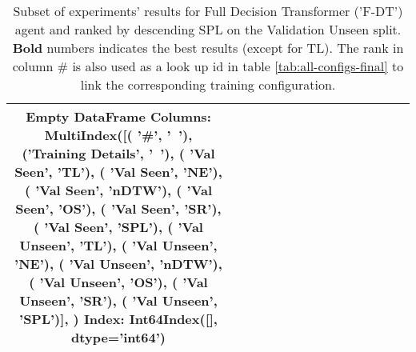 \begin{table}
\centering
\caption{\label{tab:f_dt_lr}Subset of experiments' results for Full Decision Transformer ('F-DT') agent and ranked by descending SPL on the Validation Unseen split. \textbf{Bold} numbers indicates the best results (except for TL). The rank in column \# is also used as a look up id in table \ref{tab:all-configs-final} to link the corresponding training configuration.}
\begin{tabular}{@{\hskip3pt}c@{\hskip3pt}c@{\hskip3pt}c@{\hskip3pt}c@{\hskip3pt}c@{\hskip3pt}c@{\hskip3pt}c@{\hskip3pt}c@{\hskip3pt}c@{\hskip3pt}c@{\hskip3pt}c@{\hskip3pt}c@{\hskip3pt}c@{\hskip3pt}c@{\hskip3pt}c}
\toprule
Empty DataFrame
Columns: MultiIndex([(              '\textbf{\#}',    '\textbf{~}'),
            ('\textbf{Training Details}',    '\textbf{~}'),
            (        '\textbf{Val Seen}',   '\textbf{TL}'),
            (        '\textbf{Val Seen}',   '\textbf{NE}'),
            (        '\textbf{Val Seen}', '\textbf{nDTW}'),
            (        '\textbf{Val Seen}',   '\textbf{OS}'),
            (        '\textbf{Val Seen}',   '\textbf{SR}'),
            (        '\textbf{Val Seen}',  '\textbf{SPL}'),
            (      '\textbf{Val Unseen}',   '\textbf{TL}'),
            (      '\textbf{Val Unseen}',   '\textbf{NE}'),
            (      '\textbf{Val Unseen}', '\textbf{nDTW}'),
            (      '\textbf{Val Unseen}',   '\textbf{OS}'),
            (      '\textbf{Val Unseen}',   '\textbf{SR}'),
            (      '\textbf{Val Unseen}',  '\textbf{SPL}')],
           )
Index: Int64Index([], dtype='int64') \\
\bottomrule
\end{tabular}
\end{table}

